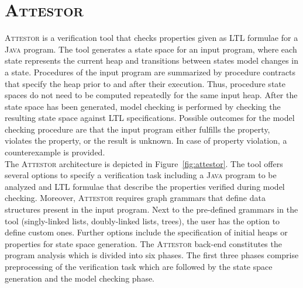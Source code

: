 \documentclass[a4paper, 12pt, twoside]{report}
\begin{document}
	\section{\textsc{Attestor}}\label{sec:attestor}
	
	\textsc{Attestor} is a verification tool that checks properties given as LTL formulae for a \textsc{Java} program. The tool generates a state space for an input program, where each state represents the current heap and transitions between states model changes in a state. Procedures of the input program are summarized by procedure contracts that specify the heap prior to and after their execution. Thus, procedure state spaces do not need to be computed repeatedly for the same input heap. After the state space has been generated, model checking is performed by checking the resulting state space against LTL specifications. Possible outcomes for the model checking procedure are that the input program either fulfills the property, violates the property, or the result is unknown. In case of property violation, a counterexample is provided.\\
	
	The \textsc{Attestor} architecture is depicted in Figure~\ref{fig:attestor}. The tool offers several options to specify a verification task including a \textsc{Java} program to be analyzed and LTL formulae that describe the properties verified during model checking. Moreover, \textsc{Attestor} requires graph grammars that define data structures present in the input program. Next to the pre-defined grammars in the tool (singly-linked lists, doubly-linked lists, trees), the user has the option to define custom ones. Further options include the specification of initial heaps or properties for state space generation. The \textsc{Attestor} back-end constitutes the program analysis which is divided into six phases. The first three phases comprise preprocessing of the verification task which are followed by the state space generation and the model checking phase.\\
	
\end{document}
